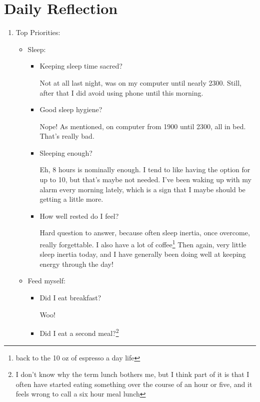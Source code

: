 \documentclass[12pt]{article}
\renewcommand{\,}{\textsuperscript{,}}
\begin{document}
\section{Daily Reflection}

\begin{enumerate}

\item Top Priorities:

\begin{itemize}

\item Sleep:

\begin{itemize}

\item Keeping sleep time sacred?

Not at all last night, was on my computer until nearly 2300.  
Still, after that I did avoid using phone until this morning.

\item Good sleep hygiene?

Nope! As mentioned, on computer from 1900 until 2300, all in bed.  
That's really bad.

\item Sleeping enough?

Eh, 8 hours is nominally enough.  
I tend to like having the option for up to 10, but that's maybe not needed.  
I've been waking up with my alarm every morning lately, which is a sign that I maybe should be getting a little more.

\item How well rested do I feel?

Hard question to answer, because often sleep inertia, once overcome, really forgettable.  
I also have a lot of coffee\footnote{back to the 10 oz of espresso a day life}  
Then again, very little sleep inertia today, and I have generally been doing well at keeping energy through the day!

\end{itemize}

\item Feed myself:

\begin{itemize}

\item Did I eat breakfast?

Woo!

\item Did I eat a second meal?\footnote{I don't know why the term lunch bothers me, but I think part of it is that I often have started eating something over the course of an hour or five, and it feels wrong to call a six hour meal lunch}


\end{itemize}
\end{itemize}
\end{enumerate}
\end{document}

